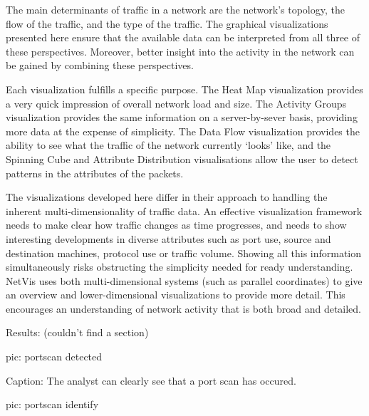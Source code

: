 The main determinants of traffic in a network are the network's topology, the flow of the traffic, and the type of the traffic. The graphical visualizations presented here ensure that the available data can be interpreted from all three of these perspectives. Moreover, better insight into the activity in the network can be gained by combining these perspectives.

Each visualization fulfills a specific purpose.  The Heat Map visualization provides a very quick impression of overall network load and size.  The Activity Groups visualization provides the same information on a server-by-sever basis, providing more data at the expense of simplicity.  The Data Flow visualization provides the ability to see what the traffic of the network currently `looks' like, and the Spinning Cube and Attribute Distribution visualisations allow the user to detect patterns in the attributes of the packets.

The visualizations developed here differ in their approach to handling the inherent multi-dimensionality of traffic data. An effective visualization framework needs to make clear how traffic changes as time progresses, and needs to show interesting developments in diverse attributes such as port use, source and destination machines, protocol use or traffic volume. Showing all this information simultaneously risks obstructing the simplicity needed for ready understanding. NetVis uses both multi-dimensional systems (such as parallel coordinates) to give an overview and lower-dimensional visualizations to provide more detail. This encourages an understanding of network activity that is both broad and detailed.




Results: (couldn't find a section)

pic: portscan detected

Caption: The analyst can clearly see that a port scan has occured.

pic: portscan identify

